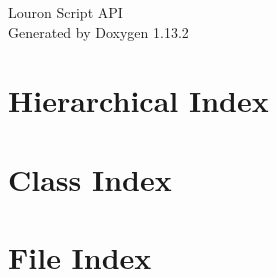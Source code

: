 \documentclass[twoside]{book}
\newcommand{\+}{\discretionary{\mbox{\scriptsize$\hookleftarrow$}}{}{}}
\newcommand{\clearemptydoublepage}{%
    \newpage{\pagestyle{empty}\cleardoublepage}%
  }
\begin{document}
  \raggedbottom
    \hypersetup{pageanchor=false,
                bookmarksnumbered=true,
                pdfencoding=unicode
               }
  \begin{titlepage}
  \vspace*{7cm}
  \begin{center}%
  {\Large Louron Script API}\\
  \vspace*{1cm}
  {\large Generated by Doxygen 1.13.2}\\
  \end{center}
  \end{titlepage}
  \clearemptydoublepage
  \tableofcontents
  \clearemptydoublepage
  \hypersetup{pageanchor=true}

\chapter{Hierarchical Index}

\chapter{Class Index}

\chapter{File Index}

\end{document}

